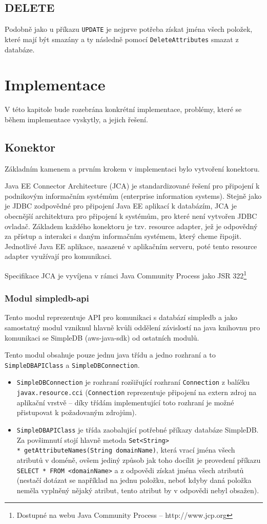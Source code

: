 \documentclass[oneside,12pt,final]{fithesis2}
\begin{document}
\section{DELETE}
Podobně jako u příkazu \verb<UPDATE< je nejprve potřeba získat jména všech položek, které mají být smazány a ty následně pomocí \verb<DeleteAttributes< smazat z databáze.
\chapter{Implementace}
V této kapitole bude rozebrána konkrétní implementace, problémy, které se během implementace vyskytly, a jejich řešení.
\section{Konektor}
Základním kamenem a prvním krokem v implementaci bylo vytvoření konektoru.

Java EE Connector Architecture (JCA) je standardizované řešení pro připojení k podnikovým informačním systémům (enterprise information systems). Stejně jako je JDBC zodpovědné pro připojení Java EE aplikací k databázím, JCA je obecnější architektura pro připojení k systémům, pro které není vytvořen JDBC ovladač. Základem každého konektoru je tzv. resource adapter, jež je odpovědný za přístup a interakci s daným informačním systémem, který cheme řipojit. Jednotlivé Java EE aplikace, nasazené v aplikačním serveru, poté tento resource adapter využívají pro komunikaci. 

Specifikace JCA je vyvíjena v rámci Java Community Process jako JSR 322\footnote{Dostupné na webu Java Community Process -- http://www.jcp.org}
\subsection{Modul simpledb-api}
Tento modul reprezentuje API pro komunikaci s databází simpledb a jako samostatný modul vzniknul hlavně kvůli oddělení závislostí na java knihovnu pro komunikaci se SimpleDB (aws-java-sdk) od ostatních modulů.

Tento modul obsahuje pouze jednu java třídu a jedno rozhraní a to \verb<SimpleDBAPIClass< a \verb<SimpleDBConnection<.
\begin{itemize}
 \item \verb<SimpleDBConnection< je rozhraní rozšiřující rozhraní \verb<Connection< z balíčku \verb<javax.resource.cci< (\verb<Connection< reprezentuje připojení na extern zdroj na aplikační vrstvě -- díky třídám implementující toto rozhraní je možné přistupovat k požadovaným zdrojům).
 \item \verb<SimpleDBAPIClass< je třída zaobalující potřebné příkazy databáze SimpleDB. Za povšimnutí stojí hlavně metoda \texttt{Set<String> \\* getAttributeNames(String domainName)}, která vrací jména všech atributů v doméně, ovšem jediný způsob jak toho docílit je provedení příkazu \texttt{SELECT * FROM <domainName>} a z odpovědi získat jména všech atributů (nestačí dotázat se například na jednu položku, neboť kdyby daná položka neměla vyplněný nějaký atribut, tento atribut by v odpovědi nebyl obsažen).
\end{itemize}
\end{document}
